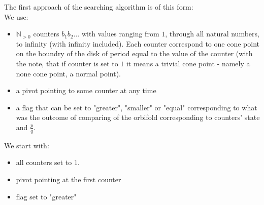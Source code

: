 The first approach of the searching algorithm is of this form: \\


We use: 
\begin{itemize}
\item $\mathbb{N}_{>0}$ counters $b_1b_2\dots$ 
with values ranging from $1$, through all natural numbers, to infinity 
(with infinity included). Each counter correspond to one cone point 
on the boundry of the disk of period equal to the value of the counter (with the note, that 
if counter is set to $1$ it means a trivial cone point - namely a none cone point, a normal point). 
\item a pivot pointing to some counter at any time
\item a flag that can be set to "greater", "smaller" or "equal" corresponding to what was 
the outcome of comparing \Eoc  of the orbifold corresponding to counters' state and 
$\frac{p}{q}$.  
\end{itemize}

We start with:
\begin{itemize}
\item all counters set to $1$. 
\item pivot pointing at the first counter
\item flag set to "greater"
\end{itemize}

